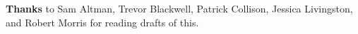                   \textbf{Thanks} to Sam Altman, Trevor Blackwell, Patrick
                  Collison, Jessica Livingston, and Robert Morris for reading
                  drafts of this.


              
            
          
            
              
                


                  
              
            
          
